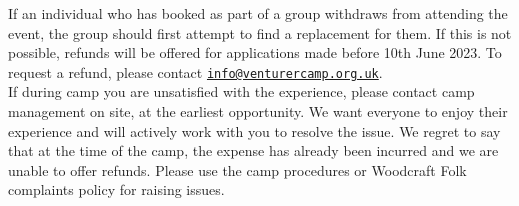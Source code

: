 If an individual who has booked as part of a group withdraws from attending the event, the group should first attempt to find a replacement for them. If this is not possible, refunds will be offered for applications made before 10th June 2023. To request a refund, please contact \href{mailto:info@venturercamp.org.uk}{\texttt{info@venturercamp.org.uk}}. \\

If during camp you are unsatisfied with the experience, please contact camp management on site, at the earliest opportunity. We want everyone to enjoy their experience and will actively work with you to resolve the issue. We regret to say that at the time of the camp, the expense has already been incurred and we are unable to offer refunds. Please use the camp procedures or Woodcraft Folk complaints policy for raising issues.


